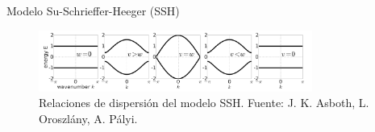 \documentclass[aspectratio=43]{beamer}
\begin{document}
\begin{frame}{Modelo Su-Schrieffer-Heeger (SSH)}
\begin{figure}
            \centering
            \includegraphics[width=0.8\textwidth]{Grafico relacion de dispersion.png}
            \caption{Relaciones de dispersión del modelo SSH. Fuente: J. K. Asboth, L. Oroszlány, A. Pályi.} 
            \label{Grafico de dispersiones}
        \end{figure}
    
\end{frame}
\end{document}
